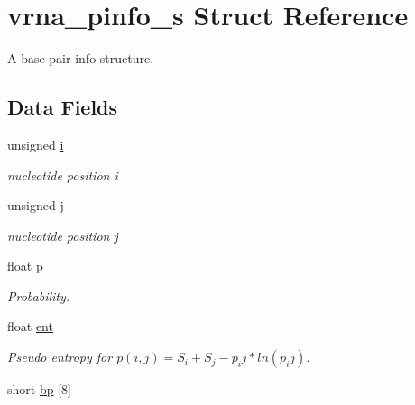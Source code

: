 \hypertarget{structvrna__pinfo__s}{}\section{vrna\+\_\+pinfo\+\_\+s Struct Reference}
\label{structvrna__pinfo__s}


A base pair info structure.  


\subsection*{Data Fields}
\begin{DoxyCompactItemize}
\item 
unsigned \hyperlink{structvrna__pinfo__s_ab91db0a87ef8402dc151795ba5a64c6f}{i}\hypertarget{structvrna__pinfo__s_ab91db0a87ef8402dc151795ba5a64c6f}{}\label{structvrna__pinfo__s_ab91db0a87ef8402dc151795ba5a64c6f}

\begin{DoxyCompactList}\small\item\em nucleotide position i \end{DoxyCompactList}\item 
unsigned \hyperlink{structvrna__pinfo__s_a4142e38d6ba127acccdf680300a88e1f}{j}\hypertarget{structvrna__pinfo__s_a4142e38d6ba127acccdf680300a88e1f}{}\label{structvrna__pinfo__s_a4142e38d6ba127acccdf680300a88e1f}

\begin{DoxyCompactList}\small\item\em nucleotide position j \end{DoxyCompactList}\item 
float \hyperlink{structvrna__pinfo__s_a71990eae41fa100db8b557e4512ec281}{p}\hypertarget{structvrna__pinfo__s_a71990eae41fa100db8b557e4512ec281}{}\label{structvrna__pinfo__s_a71990eae41fa100db8b557e4512ec281}

\begin{DoxyCompactList}\small\item\em Probability. \end{DoxyCompactList}\item 
float \hyperlink{structvrna__pinfo__s_a5ab2a63f3da8e12c6d54d8e9dd9e3e73}{ent}\hypertarget{structvrna__pinfo__s_a5ab2a63f3da8e12c6d54d8e9dd9e3e73}{}\label{structvrna__pinfo__s_a5ab2a63f3da8e12c6d54d8e9dd9e3e73}

\begin{DoxyCompactList}\small\item\em Pseudo entropy for $ p(i,j) = S_i + S_j - p_ij*ln(p_ij) $. \end{DoxyCompactList}\item 
short \hyperlink{structvrna__pinfo__s_aa5feac5559b36dcd7cb38111c45d444d}{bp} \mbox{[}8\mbox{]}\hypertarget{structvrna__pinfo__s_aa5feac5559b36dcd7cb38111c45d444d}{}\label{structvrna__pinfo__s_aa5feac5559b36dcd7cb38111c45d444d}


\end{DoxyCompactItemize}
